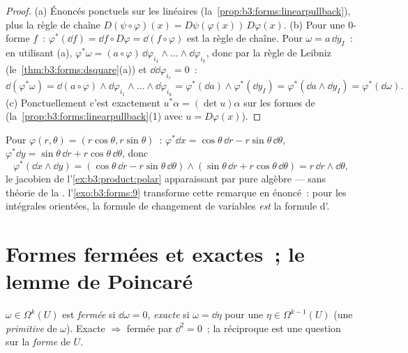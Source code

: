 \begin{proof}
(a) Énoncés ponctuels sur les  linéaires
(la~\cref{prop:b3:forms:linearpullback}), plus la règle de
chaîne $D(\psi\circ\varphi)(x) =
D\psi(\varphi(x))\,D\varphi(x)$.
(b) Pour une $0$-forme $f$~: $\varphi^*(\dd f) = \dd f \circ
D\varphi = \dd(f \circ \varphi)$ est la règle de chaîne.
Pour $\omega = a\,\dd y_I$~: en utilisant (a),
$\varphi^*\omega =
(a\circ\varphi)\,\dd\varphi_{i_1}\wedge\dots\wedge
\dd\varphi_{i_k}$, donc par la règle de Leibniz
(le~\cref{thm:b3:forms:dsquare}(a)) et $\dd\dd\varphi_{i_r} =
0$~:
\[
\dd(\varphi^*\omega) = \dd(a\circ\varphi) \wedge
\dd\varphi_{i_1}\wedge\dots\wedge\dd\varphi_{i_k}
= \varphi^*(\dd a) \wedge \varphi^*(\dd y_I)
= \varphi^*(\dd a \wedge \dd y_I) =
\varphi^*(\dd\omega).
\]
(c) Ponctuellement c'est exactement $u^*\alpha = (\det
u)\alpha$ sur les formes de  
(la~\cref{prop:b3:forms:linearpullback}(1) avec $u =
D\varphi(x)$).
\end{proof}

\begin{example}\label{ex:b3:forms:polar}
Pour $\varphi(r, \theta) = (r\cos\theta, r\sin\theta)$~:
$\varphi^*\dd x = \cos\theta\,\dd r -
r\sin\theta\,\dd\theta$, $\varphi^*\dd y = \sin\theta\,\dd r
+ r\cos\theta\,\dd\theta$, donc
\[
\varphi^*(\dd x \wedge \dd y) =
(\cos\theta\,\dd r - r\sin\theta\,\dd\theta) \wedge
(\sin\theta\,\dd r + r\cos\theta\,\dd\theta)
= r\,\dd r \wedge \dd\theta,
\]
le jacobien de l'\cref{ex:b3:product:polar} apparaissant par
pure algèbre --- sans théorie de la .
l'\cref{exo:b3:forms:9} transforme cette remarque en énoncé~:
pour les intégrales orientées, la formule de changement de
variables \emph{est} la formule d'.
\end{example}

\section{Formes fermées et exactes~; le lemme de Poincaré}

\begin{definition}\label{def:b3:forms:closedexact}
$\omega \in \Omega^k(U)$ est \emph{fermée} si $\dd\omega = 0$, \emph{exacte} si $\omega = \dd\eta$ pour une $\eta \in
\Omega^{k-1}(U)$ (une \emph{primitive} de $\omega$). Exacte
$\Rightarrow$ fermée par $\dd^2 = 0$~; la réciproque est une
question sur la \emph{forme} de $U$.
\end{definition}

